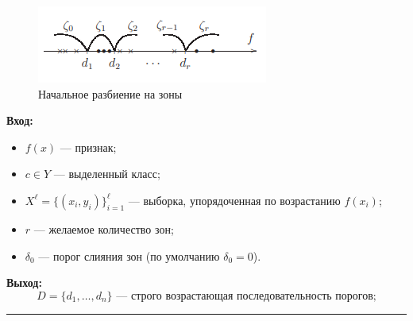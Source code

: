 \begin{figure}
    \centering
    \includegraphics[scale = 1]{chapters/logical/images/bin2.png}
    \caption{Начальное разбиение на зоны}
\end{figure}

\newpage
\textbf{Вход:}
\begin{itemize}
    \item $f(x)$ — признак;
    \item $c \in Y$ — выделенный класс;
    \item $X^\ell = \{(x_i, y_i)\}_{i=1}^\ell$ — выборка, упорядоченная по возрастанию $f(x_i)$;
    \item $r$ — желаемое количество зон;
    \item $\delta_0$ — порог слияния зон (по умолчанию $\delta_0 = 0$).
\end{itemize}

\textbf{Выход:}
\[
    D = \{d_1, \dots, d_n\} \text{ — строго возрастающая последовательность порогов;}
\]

\hrule

